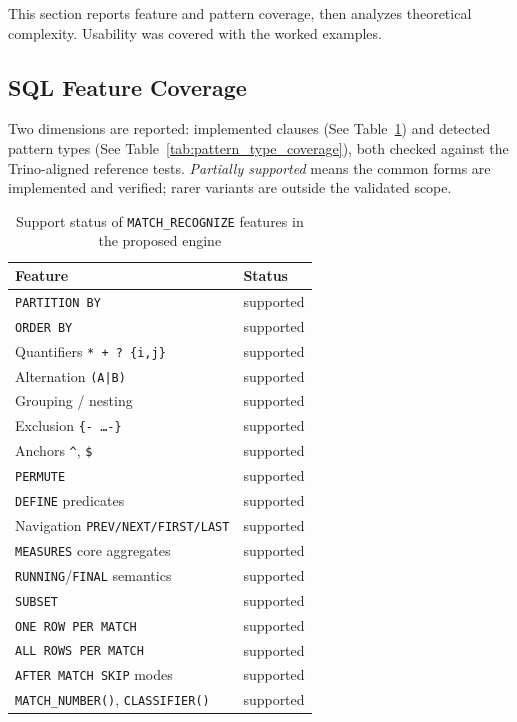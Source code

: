 This section reports feature and pattern coverage, then analyzes
theoretical complexity.  Usability was covered with the worked
examples.

\subsection{SQL Feature Coverage}
\label{subsec:eval-feature-coverage}

Two dimensions are reported: implemented clauses
(See Table~\ref{tab:feature_coverage}) and detected pattern types
(See Table~\ref{tab:pattern_type_coverage}), both checked against the
Trino-aligned reference tests.  \emph{Partially supported} means the
common forms are implemented and verified; rarer variants are
outside the validated scope.

\begin{table}[H]
\centering
\caption{Support status of \texttt{MATCH\_RECOGNIZE} features in the
  proposed engine}
\label{tab:feature_coverage}
{\small
\begin{tabularx}{\textwidth}{>{\raggedright\arraybackslash}p{}X}
\toprule
\textbf{Feature} & \textbf{Status} \\
\midrule
\texttt{PARTITION BY} & supported \\
\texttt{ORDER BY} & supported \\
Quantifiers \texttt{* + ? \{i,j\}} & supported \\
Alternation \texttt{(A|B)} & supported \\
Grouping / nesting & supported \\
Exclusion \texttt{\{- \ldots -\}} & supported \\
Anchors \texttt{\^{}}, \texttt{\$} & supported \\
\texttt{PERMUTE} & supported \\
\texttt{DEFINE} predicates & supported \\
Navigation \texttt{PREV/NEXT/FIRST/LAST} & supported \\
\texttt{MEASURES} core aggregates & supported \\
\texttt{RUNNING}/\texttt{FINAL} semantics & supported  \\
\texttt{SUBSET} & supported \\
\texttt{ONE ROW PER MATCH} & supported \\
\texttt{ALL ROWS PER MATCH} & supported \\
\texttt{AFTER MATCH SKIP} modes & supported \\
\texttt{MATCH\_NUMBER()}, \texttt{CLASSIFIER()} & supported \\
\bottomrule
\end{tabularx}
}
\end{table}

